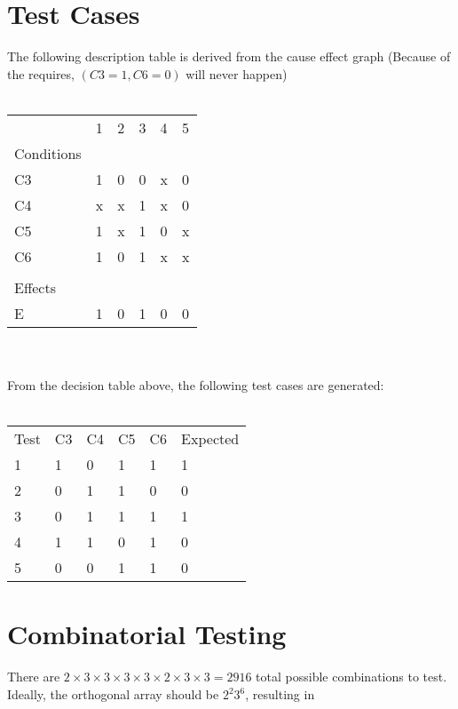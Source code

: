 \documentclass[letterpaper]{article}
\begin{document}
\section{Test Cases}
The following description table is derived from the cause effect graph
(Because of the requires, $(C3=1, C6=0)$ will never happen)
\\ \\
\begin{adjustbox}{center}
	\begin{tabular}{llllll}
		           & 1 & 2 & 3 & 4 & 5 \\ \cline{2-6}
		Conditions &   &   &   &   &   \\ \cline{1-1}
		C3         & 1 & 0 & 0 & x & 0 \\
		C4         & x & x & 1 & x & 0 \\
		C5         & 1 & x & 1 & 0 & x \\
		C6         & 1 & 0 & 1 & x & x \\
		           &   &   &   &   &   \\
		Effects    &   &   &   &   &   \\ \cline{1-1}
		E          & 1 & 0 & 1 & 0 & 0 \\
	\end{tabular}
\end{adjustbox}
\\ \\
From the decision table above, the following test cases are generated:
\\ \\
\begin{adjustbox}{center}
	\begin{tabular}{llllll}
		Test & C3 & C4 & C5 & C6 & Expected \\ \cline{1-1} \cline{6-6}
		1    & 1  & 0  & 1  & 1  & 1        \\
		2    & 0  & 1  & 1  & 0  & 0        \\
		3    & 0  & 1  & 1  & 1  & 1        \\
		4    & 1  & 1  & 0  & 1  & 0        \\
		5    & 0  & 0  & 1  & 1  & 0        \\
	\end{tabular}
\end{adjustbox}
\section{Combinatorial Testing}
There are
$2 \times 3 \times 3 \times 3 \times 3 \times 2 \times 3 \times 3 = 2916$
total possible combinations to test.
Ideally, the orthogonal array should be $2^2 3^6$,
resulting in
\end{document}
